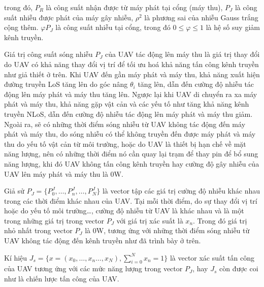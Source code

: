 \documentclass{uetgraduation}
\begin{document}
trong đó, $P_R$ là công suất nhận được từ máy phát tại cổng (máy thu), $P_J$ là công suất nhiễu được phát của máy gây nhiễu, $\rho^2$ là phương sai của nhiễu Gauss trắng cộng thêm. 
$\varphi P_J$ là công suất nhiễu tại cổng, trong đó $0 \leq \varphi \leq 1$ là hệ số suy giảm kênh truyền.

Giá trị công suất sóng nhiễu $P_J$ của UAV tác động lên máy thu là giá trị thay đổi do UAV có khả năng thay đổi vị trí để tối ưu hoá khả năng tấn công kênh truyền như giả thiết ở trên.
Khi UAV đến gần máy phát và máy thu, khả năng xuất hiện đường truyền LoS tăng lên do góc nâng $\theta_i$
tăng lên, dẫn đến cường độ nhiễu tác động lên máy phát và máy thu tăng lên. Ngược lại khi UAV di chuyển ra xa máy phát và máy thu, khả năng gặp vật cản và các yếu tố như tăng khả năng kênh
truyền NLoS, dẫn đến cường độ nhiễu tác động lên máy phát và máy thu giảm. Ngoài ra, sẽ có những thời điểm sóng nhiễu từ UAV không tác động đến máy phát và máy thu, do sóng nhiễu có thể không
truyền đến được máy phát và máy thu do yếu tố vật cản từ môi trường, hoặc do UAV là thiết bị hạn chế về mặt năng lượng, nên có những thời điểm nó cần quay lại trạm để thay pin để bổ sung năng
lượng, khi đó UAV không tấn công kênh truyền hay cường độ gây nhiễu của UAV lên máy phát và máy thu là 0W.

Giả sử $P_J = \{P_0^J, \dots, P_n^J, \dots, P_N^J\}$ là vector tập các giá trị cường độ nhiễu khác nhau trong các thời điểm khác nhau của UAV. Tại mỗi thời điểm, do sự thay đổi vị trí
hoặc do yếu tố môi trường\dots, cường độ nhiễu từ UAV là khác nhau và là một trong những giá trị trong vector $P_J$ với giá trị xác suất là $x_n$. Trong đó giá trị nhỏ nhất trong vector $P_J$
là 0W, tương ứng với những thời điểm sóng nhiễu từ UAV không tác động đến kênh truyền như đã trình bày ở trên.

Kí hiệu $J_s = \{x = (x_0, \dots, x_n\dots, x_N), \sum_{i=0}^{N}x_n = 1\}$ là vector xác suất tấn công của UAV tương ứng với các mức năng lượng trong vector $P_J$, hay $J_s$ còn được coi như
là chiến lược tấn công của UAV.
\end{document}
